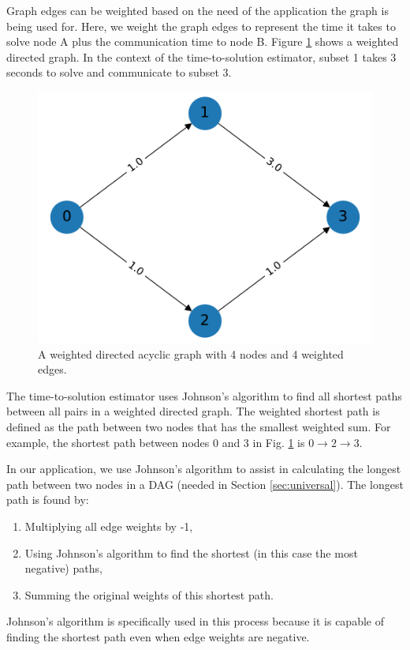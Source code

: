 Graph edges can be weighted based on the need of the application the graph is being used for. Here, we weight the graph edges to represent the time it takes to solve node A plus the communication time to node B.
Figure \ref{weighted_directed_graph} shows a weighted directed graph.
In the context of the time-to-solution estimator, subset 1 takes 3 seconds to solve and communicate to subset 3.
\begin{figure}[H]
\centering
\includegraphics[scale=0.5]{../../figures/weighted_directed_graph.pdf}
\caption{A weighted directed acyclic graph with 4 nodes and 4 weighted edges.}
\label{weighted_directed_graph}
\end{figure}

The time-to-solution estimator uses Johnson's algorithm \cite{intro_to_alg,johnson_nist,johnson_johnson} to find all shortest paths between all pairs in a weighted directed graph.
The weighted shortest path is defined as the path between two nodes that has the smallest weighted sum.
For example, the shortest path between nodes 0 and 3 in Fig. \ref{weighted_directed_graph} is $0\rightarrow 2\rightarrow 3$.

In our application, we use Johnson's algorithm to assist in calculating the longest path between two nodes in a DAG (needed in Section \ref{sec:universal}).
The longest path is found by:
\begin{enumerate}
  \item Multiplying all edge weights by -1,
  \item Using Johnson's algorithm to find the shortest (in this case the most negative) paths,
  \item Summing the original weights of this shortest path.
\end{enumerate}
Johnson's algorithm is specifically used in this process because it is capable of finding the shortest path even when edge weights are negative.

